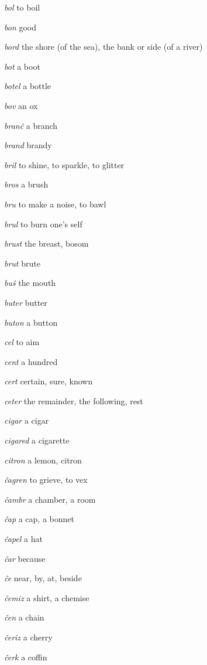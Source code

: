 \begin{landscape}
\begin{multicols}{5}
\begin{outdent}{1em}
\emph{bol  }to boil

\emph{bon  }good

\emph{bord}  the shore (of the sea), the bank or side (of a river)

\emph{bot}  a boot

\emph{botel}  a bottle

\emph{bov}  an ox

\emph{branĉ}  a branch

\emph{brand}  brandy

\emph{bril}  to shine, to sparkle, to glitter

\emph{bros}  a brush

\emph{bru}  to make a noise, to bawl

\emph{brul} to burn one’s self

\emph{brust}  the breast, bosom

\emph{brut}  brute

\emph{buŝ}  the mouth

\emph{buter}  butter

\emph{buton } a button
\end{outdent}


\begin{outdent}{1em}
\emph{cel}  to aim

\emph{cent}  a hundred

\emph{cert}  certain, sure, known

\emph{ceter} the remainder, the following, rest

\emph{cigar } a cigar

\emph{cigared}  a cigarette

\emph{citron}  a lemon, citron
\end{outdent}


\begin{outdent}{1em}
\emph{ĉagren}  to grieve, to vex

\emph{ĉambr}  a chamber, a room

\emph{ĉap } a cap, a bonnet

\emph{ĉapel}  a hat

\emph{ĉar}  because

\emph{ĉe}  near, by, at, beside

\emph{ĉemiz}  a shirt, a chemise

\emph{ĉen}  a chain

\emph{ĉeriz}  a cherry

\emph{ĉerk}  a coffin


\end{outdent}
\end{multicols}
\end{landscape}
